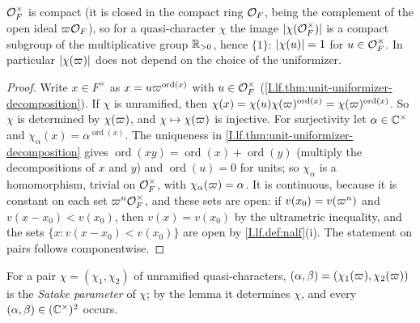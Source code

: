 \begin{definition}
\end{definition}

\begin{remark}\label{rem:smooth-unit-values}
$\mathcal{O}_F^\times$ is compact (it is closed in the compact ring $\mathcal{O}_F$, being the complement of the open ideal
$\varpi\mathcal{O}_F$), so for a quasi-character $\chi$ the image $\lvert\chi(\mathcal{O}_F^\times)\rvert$ is a compact subgroup of the
multiplicative group $\mathbb{R}_{>0}$, hence $\{1\}$: $\lvert\chi(u)\rvert=1$ for $u\in\mathcal{O}_F^\times$. In particular
$\lvert\chi(\varpi)\rvert$ does not depend on the choice of the uniformizer.
\end{remark}

\begin{lemma}
\end{lemma}
\begin{proof}
Write $x\in F^\times$ as $x=u\varpi^{\operatorname{ord}(x)}$ with $u\in\mathcal{O}_F^\times$
(\cref{I.lf.thm:unit-uniformizer-decomposition}). If $\chi$ is unramified, then
$\chi(x)=\chi(u)\chi(\varpi)^{\operatorname{ord}(x)}=\chi(\varpi)^{\operatorname{ord}(x)}$. So $\chi$ is determined by
$\chi(\varpi)$, and $\chi\mapsto\chi(\varpi)$ is injective. For surjectivity let $\alpha\in\mathbb{C}^\times$ and
$\chi_\alpha(x)=\alpha^{\operatorname{ord}(x)}$. The uniqueness in \cref{I.lf.thm:unit-uniformizer-decomposition}
gives $\operatorname{ord}(xy)=\operatorname{ord}(x)+\operatorname{ord}(y)$ (multiply the decompositions of $x$ and $y$)
and $\operatorname{ord}(u)=0$ for units; so $\chi_\alpha$ is a homomorphism, trivial on $\mathcal{O}_F^\times$, with
$\chi_\alpha(\varpi)=\alpha$. It is continuous, because it is constant on each set $\varpi^n\mathcal{O}_F^\times$, and these sets
are open: if $v(x_0)=v(\varpi^n)$ and $v(x-x_0)<v(x_0)$, then $v(x)=v(x_0)$ by the ultrametric inequality, and the sets
$\{x:v(x-x_0)<v(x_0)\}$ are open by \cref{I.lf.def:nalf}(i). The statement on pairs follows componentwise.
\end{proof}

\noindent For a pair $\chi=(\chi_1,\chi_2)$ of unramified quasi-characters, $(\alpha,\beta)=(\chi_1(\varpi),\chi_2(\varpi))$
is the \emph{Satake parameter} of $\chi$; by the lemma it determines $\chi$, and every
$(\alpha,\beta)\in(\mathbb{C}^\times)^2$ occurs.

